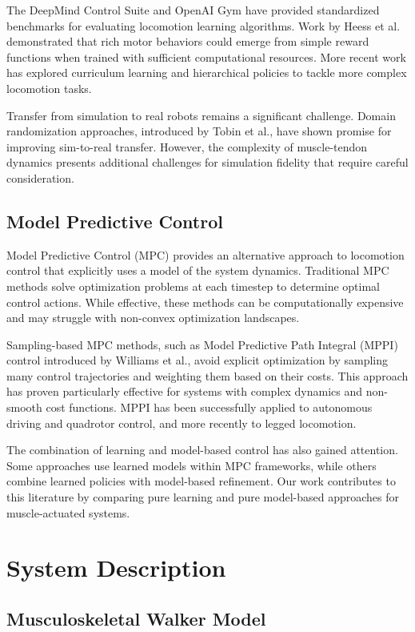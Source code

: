 \documentclass[conference]{IEEEtran}
\begin{document}
The DeepMind Control Suite and OpenAI Gym have provided standardized benchmarks for evaluating locomotion learning algorithms. Work by Heess et al. demonstrated that rich motor behaviors could emerge from simple reward functions when trained with sufficient computational resources. More recent work has explored curriculum learning and hierarchical policies to tackle more complex locomotion tasks.

Transfer from simulation to real robots remains a significant challenge. Domain randomization approaches, introduced by Tobin et al., have shown promise for improving sim-to-real transfer. However, the complexity of muscle-tendon dynamics presents additional challenges for simulation fidelity that require careful consideration.

\subsection{Model Predictive Control}

Model Predictive Control (MPC) provides an alternative approach to locomotion control that explicitly uses a model of the system dynamics. Traditional MPC methods solve optimization problems at each timestep to determine optimal control actions. While effective, these methods can be computationally expensive and may struggle with non-convex optimization landscapes.

Sampling-based MPC methods, such as Model Predictive Path Integral (MPPI) control introduced by Williams et al., avoid explicit optimization by sampling many control trajectories and weighting them based on their costs. This approach has proven particularly effective for systems with complex dynamics and non-smooth cost functions. MPPI has been successfully applied to autonomous driving and quadrotor control, and more recently to legged locomotion.

The combination of learning and model-based control has also gained attention. Some approaches use learned models within MPC frameworks, while others combine learned policies with model-based refinement. Our work contributes to this literature by comparing pure learning and pure model-based approaches for muscle-actuated systems.

\section{System Description}

\subsection{Musculoskeletal Walker Model}
\end{document}
